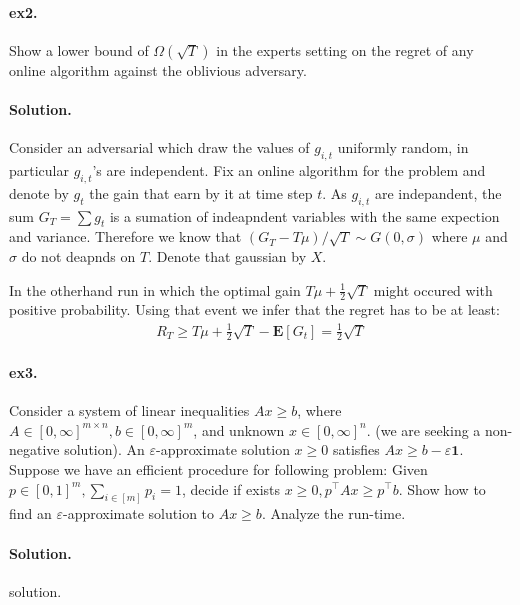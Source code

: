\documentclass{article}
\newcommand{\expp}[1]{ \mathbf{E} \left[ {#1} \right]}
\begin{document}
\begin{multicols*}{2}
  \paragraph{ex2.} Show a lower bound of $\Omega\left( \sqrt{T} \right)$ in the experts setting on the regret of any online algorithm against the oblivious adversary. 

  \paragraph{Solution.} Consider an adversarial which draw the values of $g_{i,t}$ uniformly random, in particular $g_{i,t}$'s are independent. Fix an online algorithm for the problem and denote by $g_{t}$ the gain that earn by it at time step $t$. As $g_{i,t}$ are indepandent, the sum $G_{T} = \sum{g_{t}}$ is a sumation of indeapndent variables with the same expection and variance. Therefore we know that $\left( G_{T} - T\mu \right)/ \sqrt{T} \sim G\left( 0 , \sigma \right)$ where $\mu$ and $\sigma$ do not deapnds on $T$. Denote that gaussian by $X$.

In the otherhand run in which the optimal gain $T\mu+\frac{1}{2}\sqrt{T}$ might occured with positive probability. Using that event we infer that the regret has to be at least: 
  \begin{equation*}
    \begin{split}
      R_{T} \ge T  \mu  + \frac{1}{2}\sqrt{T}- \expp{G_{t}} = \frac{1}{2}\sqrt{T}
    \end{split}
  \end{equation*}
  \paragraph{ex3.}Consider a system of linear inequalities $Ax \ge b$, where $A\in [0, \infty]^{m\times n} , b \in  [0, \infty]^{m}$, and unknown $x \in  [0, \infty]^{ n}$. (we are seeking a non-negative solution). An $\varepsilon$-approximate solution $x\ge 0$ satisfies $Ax\ge b - \varepsilon \mathbf{1}$. Suppose we have an efficient procedure for following problem: Given $p \in [0,1]^{m}, \sum_{i \in [m]}{p_{i}} = 1$, decide if exists $x \ge 0, p^{\top}Ax \ge p^{\top}b$. Show how to find an $\varepsilon$-approximate solution to $Ax \ge b$. Analyze the run-time. 
  \paragraph{Solution.} solution. 

\end{multicols*}
\end{document}
